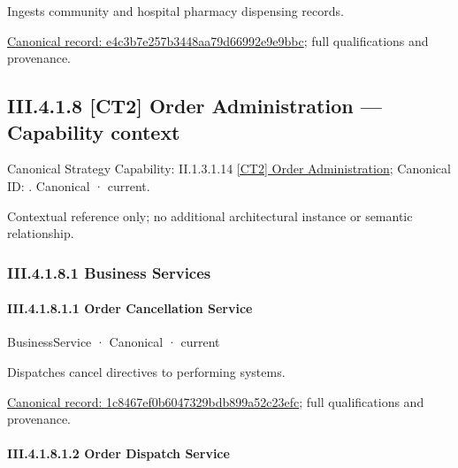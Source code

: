 Ingests community and hospital pharmacy dispensing records.


{\footnotesize \href{../../../../../../../continuum/business/business-function/e4c3b7e257b3448aa79d66992e9e9bbc.md}{Canonical record: e4c3b7e257b3448aa79d66992e9e9bbc}; full qualifications and provenance.}\par
\subsection*{III.4.1.8 [CT2] Order Administration — Capability context}
\label{navigation:III.4.1.8}

{\small Canonical Strategy Capability: II.1.3.1.14 \hyperref[element:c3c5abd7987f4433a46cbfed8167914c]{[CT2] Order Administration}; Canonical ID: \texttt{}. Canonical · current.}\par
Contextual reference only; no additional architectural instance or semantic relationship.\par
\subsubsection*{III.4.1.8.1 Business Services}
\label{navigation:III.4.1.8.1}

\paragraph*{III.4.1.8.1.1 Order Cancellation Service}
\label{navigation:III.4.1.8.1.1}

\label{element:1c8467ef0b6047329bdb899a52c23efc}
{\small BusinessService · Canonical · current}\par

Dispatches cancel directives to performing systems.


{\footnotesize \href{../../../../../../../continuum/business/business-service/1c8467ef0b6047329bdb899a52c23efc.md}{Canonical record: 1c8467ef0b6047329bdb899a52c23efc}; full qualifications and provenance.}\par
\paragraph*{III.4.1.8.1.2 Order Dispatch Service}
\label{navigation:III.4.1.8.1.2}

